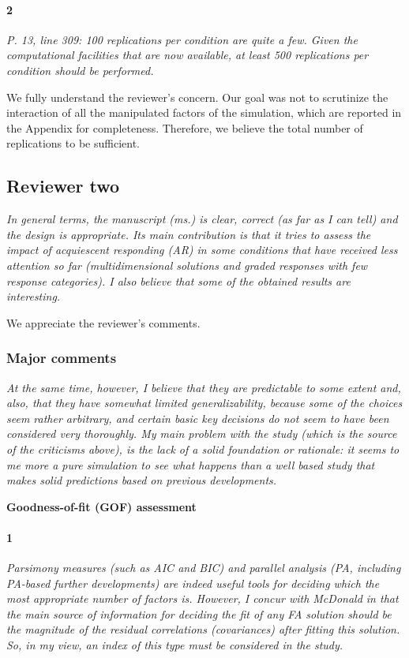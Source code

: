 \documentclass[a4paper]{article}
\begin{document}
\paragraph{2} \textit{P. 13, line 309: 100 replications per condition are quite a few. Given the computational facilities that are now available, at least 500 replications per condition should be performed.}

We fully understand the reviewer's concern. Our goal was not to scrutinize the interaction of all the manipulated factors of the simulation, which are reported in the Appendix for completeness. Therefore, we believe the total number of replications to be sufficient.


\subsection*{Reviewer two}
\textit{In general terms, the manuscript (ms.) is clear, correct (as far as I can tell) and the design is appropriate. Its main contribution is that it tries to assess the impact of acquiescent responding (AR) in some conditions that have received less attention so far (multidimensional solutions and graded responses with few response categories). I also believe that some of the obtained results are interesting.}

We appreciate the reviewer's comments. 

\subsubsection*{Major comments}

\textit{At the same time, however, I believe that they are predictable to some extent and, also, that they have somewhat limited generalizability, because some of the choices seem rather arbitrary, and certain basic key decisions do not seem to have been considered very thoroughly. My main problem with the study (which is the source of the criticisms above), is the lack of a solid foundation or rationale: it seems to me more a pure simulation to see what happens than a well based study that makes solid predictions based on previous developments.}

\textbf{Goodness-of-fit (GOF) assessment}
\paragraph{1} \textit{Parsimony measures (such as AIC and BIC) and parallel analysis (PA, including PA-based further developments) are indeed useful tools for deciding which the most appropriate number of factors is. However, I concur with McDonald in that the main source of information for deciding the fit of any FA solution should be the magnitude of the residual correlations (covariances) after fitting this solution. So, in my view, an index of this type must be considered in the study.}
\end{document}
